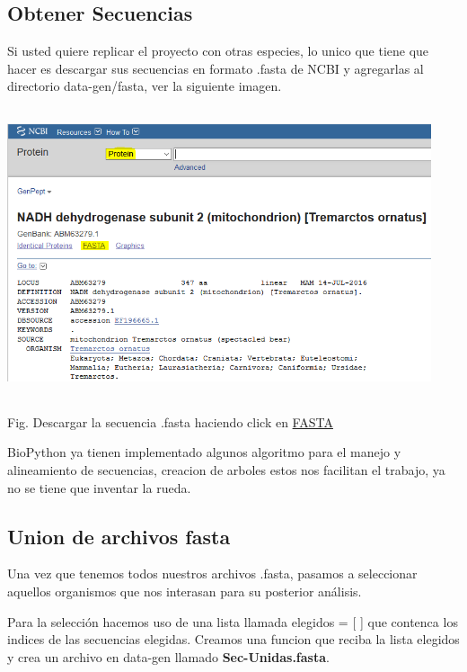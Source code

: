 \documentclass[a4paper]{article}
\begin{document}
\subsection{Obtener Secuencias}
\noindent Si usted quiere replicar el proyecto con otras especies, lo unico que tiene que hacer es descargar sus secuencias en formato .fasta de NCBI y agregarlas al directorio data-gen/fasta, ver la siguiente imagen.

\begin{center}
	\includegraphics[width=12.5cm,height=8.5cm]{ncbi_replica.png}
	
	Fig. Descargar la secuencia .fasta haciendo click en \underline{FASTA}
\end{center}

\noindent BioPython ya tienen implementado algunos algoritmo para el manejo y alineamiento de secuencias, creacion de arboles estos nos facilitan el trabajo, ya no se tiene que inventar la rueda.

\subsection{Union de archivos fasta}

Una vez que tenemos todos nuestros archivos .fasta, pasamos a seleccionar aquellos organismos que nos interasan para su posterior análisis.

\noindent Para la selección hacemos uso de una lista llamada elegidos = [  ] que contenca los indices de las secuencias elegidas. Creamos una funcion que reciba la lista elegidos y crea un archivo en data-gen llamado \textbf{Sec-Unidas.fasta}.
\end{document}
